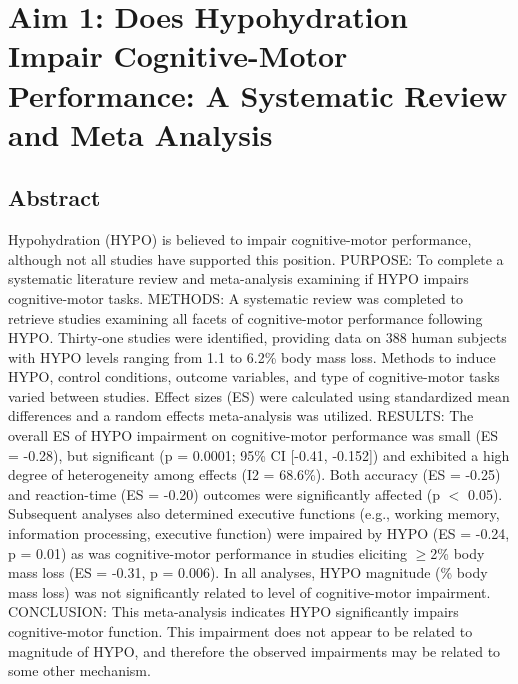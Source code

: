 \chapter{Aim 1: Does Hypohydration Impair Cognitive-Motor Performance: A Systematic Review and Meta Analysis}

\section{Abstract}
Hypohydration (HYPO) is believed to impair cognitive-motor performance, although not all studies have supported this position. PURPOSE: To complete a systematic literature review and meta-analysis examining if HYPO impairs cognitive-motor tasks. METHODS: A systematic review was completed to retrieve studies examining all facets of cognitive-motor performance following HYPO. Thirty-one studies were identified, providing data on 388 human subjects with HYPO levels ranging from 1.1 to 6.2\% body mass loss. Methods to induce HYPO, control conditions, outcome variables, and type of cognitive-motor tasks varied between studies. Effect sizes (ES) were calculated using standardized mean differences and a random effects meta-analysis was utilized. RESULTS: The overall ES of HYPO impairment on cognitive-motor performance was small (ES = -0.28), but significant (p = 0.0001; 95\% CI [-0.41, -0.152]) and exhibited a high degree of heterogeneity among effects (I2 = 68.6\%). Both accuracy (ES = -0.25) and reaction-time (ES = -0.20) outcomes were significantly affected (p $<$ 0.05). Subsequent analyses also determined executive functions (e.g., working memory, information processing, executive function) were impaired by HYPO (ES = -0.24, p = 0.01) as was cognitive-motor performance in studies eliciting ${\geq}$2\% body mass loss (ES = -0.31, p = 0.006). In all analyses, HYPO magnitude (\% body mass loss) was not significantly related to level of cognitive-motor impairment. CONCLUSION: This meta-analysis indicates HYPO significantly impairs cognitive-motor function. This impairment does not appear to be related to magnitude of HYPO, and therefore the observed impairments may be related to some other mechanism.


